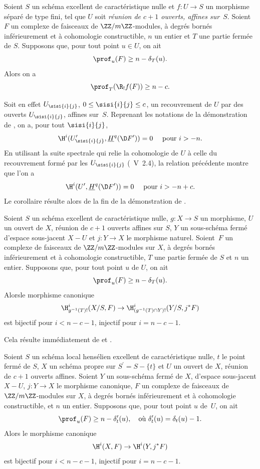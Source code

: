 \begin{corollaire} \label{XIV.4.3}
Soient $S$ un sch\'ema excellent de caract\'eristique nulle et $f\colon U\to S$ un morphisme s\'epar\'e de type fini, tel que $U$ soit \emph{r\'eunion de $c+1$ ouverts, affines sur~$S$}. Soient $F$ un complexe de faisceaux de $\ZZ/m\ZZ$-modules, \`a degr\'es born\'es inf\'erieurement et \`a cohomologie constructible, $n$ un entier et $T$ une partie ferm\'ee de $S$. Supposons que, pour tout point $u\in U$, on ait
$$
\prof_{u}(F)\geq n-\delta_{T}(u).
$$
Alors on a\pageoriginale
$$
\prof_{T}(\R_{!}f(F))\geq n-c.
$$
\end{corollaire}

Soit en effet $U_{\sisi{i}{j}}$, $0\leq \sisi{i}{j}\leq c$, un recouvrement de $U$ par des ouverts $U_{\sisi{i}{j}}$, affines sur~$S$. Reprenant les notations de la d\'emonstration de , on a, pour tout $\sisi{i}{j}$,
$$
\H^{i}(U_{\sisi{i}{j}}^{\prime}, \underline{H}^{q}(\D F^{\prime}))=0\quad\textrm{ pour }i>-n.
$$
En utilisant la suite spectrale qui relie la cohomologie de $U$ \`a celle du recouvrement form\'e par les $U_{\sisi{i}{j}}$ (~V~2.4), la relation pr\'ec\'edente montre que l'on a
$$
\H^{i}(U^{\prime}, \underline{H}^{q}(\D F^{\prime}))=0\quad\textrm{ pour }i>-n+c.
$$
Le corollaire r\'esulte alors de la fin de la d\'emonstration de .

\begin{corollaire} \label{XIV.4.4}
Soient $S$ un sch\'ema excellent de caract\'eristique nulle, $g\colon X\to S$ un morphisme, $U$ un ouvert de $X$, r\'eunion de $c+1$ ouverts affines sur $S$, $Y$ un sous-sch\'ema ferm\'e d'espace sous-jacent $X-U$ et $j\colon Y\to X$ le morphisme naturel. Soient~$F$ un complexe de faisceaux de $\ZZ/m\ZZ$-modules sur $X$, \`a degr\'es born\'es inf\'erieurement et \`a cohomologie constructible, $T$ une partie ferm\'ee de $S$ et $n$ un entier. Supposons que, pour tout point $u$ de $U$, on ait
$$
\prof_{u}(F)\geq n-\delta_{T}(u).
$$
Alors\pageoriginale le morphisme canonique
$$
\H_{g^{-1}(T)!}^{i}(X/S, F)\to\H_{(g^{-1}(T)\cap Y)!}^{i}(Y/S, j^{\ast}F)$$
est bijectif pour $i<n-c-1$, injectif pour $i=n-c-1$.
\end{corollaire}

Cela r\'esulte imm\'ediatement de  et .

\begin{corollaire} \label{XIV.4.5}
Soient $S$ un sch\'ema local hens\'elien excellent de caract\'eristique nulle, $t$ le point ferm\'e de $S$, $X$ un sch\'ema propre sur $S^{\prime}=S-\{ t\}$ et $U$ un ouvert de $X$, r\'eunion de $c+1$ ouverts affines. Soient $Y$ un sous-sch\'ema ferm\'e de $X$, d'espace sous-jacent $X-U$, $j\colon Y\to X$ le morphisme canonique, $F$ un complexe de faisceaux de $\ZZ/m\ZZ$-modules sur $X$, \`a degr\'es born\'es inf\'erieurement et \`a cohomologie constructible, et $n$ un entier. Supposons que, pour tout point $u$ de~$U$, on ait
$$
\prof_{u}(F)\geq n-\delta_{t}^{\prime}(u), \quad\text{o\`u } \delta_{t}^{\prime}(u)=\delta_{t}(u)-1.
$$
Alors le morphisme canonique
$$
\H^{i}(X, F)\to\H^{i}(Y, j^{\ast}F)$$
est bijectif pour $i<n-c-1$, injectif pour $i=n-c-1$.
\end{corollaire}

